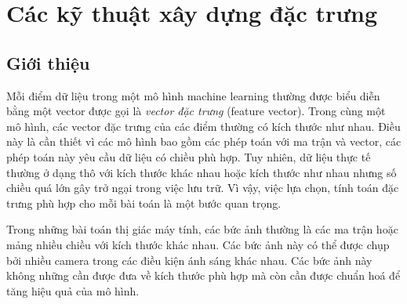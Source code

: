 \chapter{Các kỹ thuật xây dựng đặc trưng}
\label{cha:feature}

\section{Giới thiệu }


Mỗi điểm dữ liệu trong một mô hình machine learning thường được biểu diễn bằng
một vector được gọi là \textit{vector đặc trưng} (feature vector). Trong cùng một mô hình, các
vector đặc trưng của các điểm thường có kích thước như nhau. Điều này là cần
thiết vì các mô hình bao gồm các phép toán với ma trận và vector, các phép toán
này yêu cầu dữ liệu có chiều phù hợp. Tuy nhiên, dữ liệu thực tế thường ở dạng
thô với kích thước khác nhau hoặc kích thước như nhau nhưng số chiều quá lớn gây
trở ngại trong việc lưu trữ. Vì vậy, việc lựa chọn, tính toán đặc trưng phù hợp
cho mỗi bài toán là một bước quan trọng.

Trong những bài toán {thị giác máy tính}, các bức ảnh thường là các ma trận hoặc
mảng nhiều chiều với kích thước khác nhau. Các bức ảnh này có thể được chụp bởi nhiều camera trong các điều kiện ánh sáng khác nhau. Các bức ảnh này không những cần được đưa về kích thước phù hợp mà còn cần được chuẩn hoá để tăng hiệu quả của mô hình.



